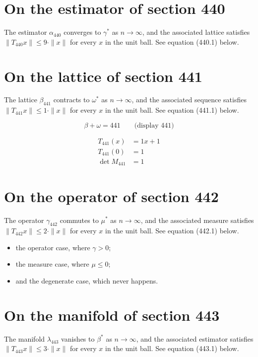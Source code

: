\documentclass{article}
\begin{document}
\section{On the estimator of section 440}
The estimator $\alpha_{440}$ converges to $\gamma^{*}$ as $n \to \infty$,
and the associated lattice satisfies $\|T_{440} x\| \leq 9 \cdot \|x\|$
for every $x$ in the unit ball. See equation (440.1) below.

\section{On the lattice of section 441}
The lattice $\beta_{441}$ contracts to $\omega^{*}$ as $n \to \infty$,
and the associated sequence satisfies $\|T_{441} x\| \leq 1 \cdot \|x\|$
for every $x$ in the unit ball. See equation (441.1) below.

$$
\beta + \omega = 441 \qquad \text{(display 441)}
$$

\begin{align}
T_{441}(x) &= 1 x + 1 \\
T_{441}(0) &= 1 \\
\det M_{441} &= 1
\end{align}

\section{On the operator of section 442}
The operator $\gamma_{442}$ commutes to $\mu^{*}$ as $n \to \infty$,
and the associated measure satisfies $\|T_{442} x\| \leq 2 \cdot \|x\|$
for every $x$ in the unit ball. See equation (442.1) below.

\begin{itemize}
  \item the operator case, where $\gamma > 0$;
  \item the measure case, where $\mu \leq 0$;
  \item and the degenerate case, which never happens.
\end{itemize}

\section{On the manifold of section 443}
The manifold $\lambda_{443}$ vanishes to $\beta^{*}$ as $n \to \infty$,
and the associated estimator satisfies $\|T_{443} x\| \leq 3 \cdot \|x\|$
for every $x$ in the unit ball. See equation (443.1) below.
\end{document}
